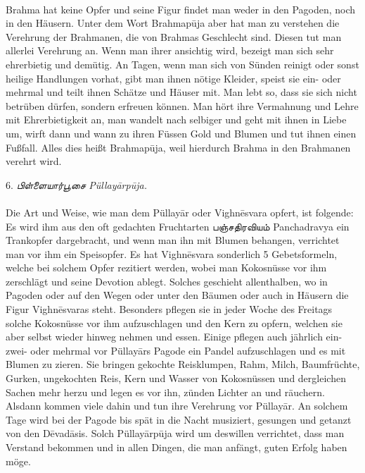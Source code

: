 \documentclass{article}
\newcommand{\TamilText}[1]{\texttamil{#1}}
\newcommand{\tam}[1]{\TamilText{#1}}
\begin{document}
\paragraph{}
Brahma hat keine Opfer und seine Figur findet man weder in den Pagoden, noch in den Häusern. Unter dem Wort Brahmap\={u}ja aber hat man zu verstehen die Verehrung der Brahmanen, die von Brahmas Geschlecht sind. Diesen tut man allerlei Verehrung an. Wenn man ihrer ansichtig wird, bezeigt man sich sehr ehrerbietig und demütig. An Tagen, wenn man sich von Sünden reinigt oder sonst heilige Handlungen vorhat, gibt man ihnen nötige Kleider, speist sie ein- oder mehrmal und teilt ihnen Schätze und Häuser mit. Man lebt so, dass sie sich nicht betrüben dürfen, sondern erfreuen können. Man hört ihre Vermahnung und Lehre mit Ehrerbietigkeit an, man wandelt nach selbiger und geht mit ihnen in Liebe um, wirft dann und wann zu ihren Füssen Gold und Blumen und tut ihnen einen Fußfall. Alles dies heißt Brahmap\={u}ja, weil hierdurch Brahma in den Brahmanen verehrt wird.

\begin{center}
6. \emph{\tam{பிள்ளையார்பூசை} Püllay\={a}rp\={u}ja.}
\end{center}
\paragraph{}
Die Art und Weise, wie man dem Püllay\={a}r oder Vighn\={e}svara opfert, ist folgende: Es wird ihm aus den oft gedachten Fruchtarten \tam{பஞ்சதிரவியம்} Panchadravya ein Trankopfer dargebracht, und wenn man ihn mit Blumen behangen, verrichtet man vor ihm ein Speisopfer. Es hat Vighn\={e}svara sonderlich 5 Gebetsformeln, welche bei solchem Opfer rezitiert werden, wobei man Kokosnüsse vor ihm zerschlägt und seine Devotion ablegt. Solches geschieht allenthalben, wo in Pagoden oder auf den Wegen oder unter den Bäumen oder auch in Häusern die Figur Vighn\={e}svaras steht. Besonders pflegen sie in jeder Woche des Freitags solche Kokosnüsse vor ihm aufzuschlagen und den Kern zu opfern, welchen sie aber selbst wieder hinweg nehmen und essen. Einige pflegen auch jährlich ein- zwei- oder mehrmal vor Püllay\={a}rs Pagode ein Pandel aufzuschlagen und es mit Blumen zu zieren. Sie bringen gekochte Reisklumpen, Rahm, Milch, Baumfrüchte, Gurken, ungekochten Reis, Kern und Wasser von Kokosnüssen und dergleichen Sachen mehr herzu und legen es vor ihn, zünden Lichter an und räuchern. Alsdann kommen viele dahin und tun ihre Verehrung vor Püllay\={a}r. An solchem Tage wird bei der Pagode bis spät in die Nacht musiziert, gesungen und getanzt von den D\={e}vad\={a}sis. Solch Püllay\={a}rp\={u}ja wird um deswillen verrichtet, dass man Verstand bekommen und in allen Dingen, die man anfängt, guten Erfolg haben möge.
\end{document}
